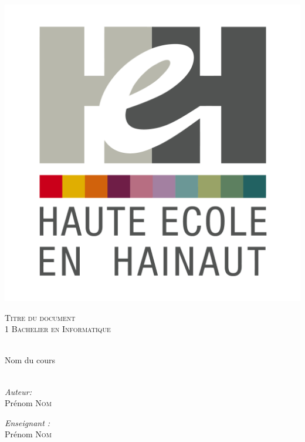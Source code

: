 \begin{center}
  \includegraphics[scale=0.12]{textures/logo/heh.pdf}

  \vspace{1cm}

  \textsc{\LARGE Titre du document} \\ [1cm]

  \textsc{\large 1 Bachelier en Informatique} \\ [0.2cm]

  \begingroup
   \selectfont 

  \HRule \\ [0.4cm] {
    \huge Nom du cours \\ [0.2cm] 
  }
  \HRule \\ [1.3cm]
  \endgroup

  \begin{minipage}[t]{0.4 \textwidth} 
    \begin{flushleft} 
      \large \emph{Auteur:} \\ 
      Prénom \textsc{Nom}
    \end{flushleft} 
  \end{minipage}
  \begin{minipage}[t]{0.4 \textwidth}
    \begin{flushright} 
      \large \emph{Enseignant :} \\ 
      Prénom \textsc{Nom}
    \end{flushright} 
  \end{minipage}


\end{center}
